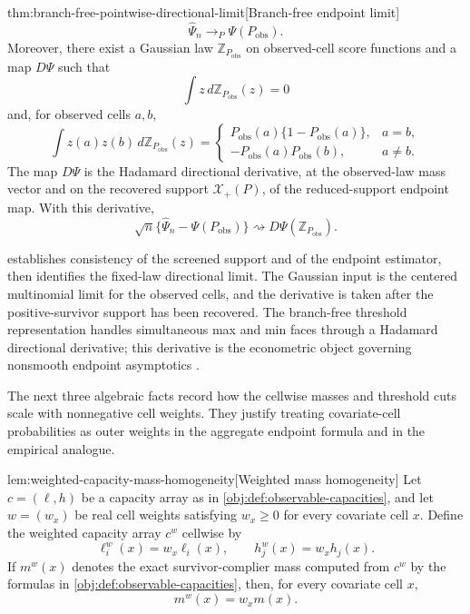 \begin{theoremv}{thm:branch-free-pointwise-directional-limit}[Branch-free endpoint limit]
\[
\widehat\Psi_n\to_P\Psi(P_{\mathrm{obs}}).
\]
Moreover, there exist a Gaussian law \(\mathbb Z_{P_{\mathrm{obs}}}\) on observed-cell score functions and a map \(D\Psi\) such that
\[
\int z\,d\mathbb Z_{P_{\mathrm{obs}}}(z)=0
\]
and, for observed cells \(a,b\),
\[
\int z(a)z(b)\,d\mathbb Z_{P_{\mathrm{obs}}}(z)
=
\begin{cases}
P_{\mathrm{obs}}(a)\{1-P_{\mathrm{obs}}(a)\}, & a=b,\\
-P_{\mathrm{obs}}(a)P_{\mathrm{obs}}(b), & a\ne b.
\end{cases}
\]
The map \(D\Psi\) is the Hadamard directional derivative, at the observed-law mass vector and on the recovered support \(\mathcal X_+(P)\), of the reduced-support endpoint map.  With this derivative,
\[
\sqrt n\{\widehat\Psi_n-\Psi(P_{\mathrm{obs}})\}
\rightsquigarrow
D\Psi(\mathbb Z_{P_{\mathrm{obs}}}).
\]
\end{theoremv}

 establishes consistency of the screened support and of the endpoint estimator, then identifies the fixed-law directional limit.  The Gaussian input  is the centered multinomial limit for the observed cells, and the derivative is taken after the positive-survivor support  has been recovered.  The branch-free threshold representation handles simultaneous max and min faces through a Hadamard directional derivative; this derivative is the econometric object governing nonsmooth endpoint asymptotics \citep{FangSantos2019,HongLi2018}.

The next three algebraic facts record how the cellwise masses and threshold cuts scale with nonnegative cell weights.  They justify treating covariate-cell probabilities as outer weights in the aggregate endpoint formula and in the empirical analogue.

\begin{lemmav}{lem:weighted-capacity-mass-homogeneity}[Weighted mass homogeneity]
Let \(c=(\ell,h)\) be a capacity array as in \cref{obj:def:observable-capacities}, and let \(w=(w_x)\) be real cell weights satisfying \(w_x\ge 0\) for every covariate cell \(x\).  Define the weighted capacity array \(c^w\) cellwise by
\[
\ell_i^w(x)=w_x\ell_i(x),
\qquad
h_j^w(x)=w_xh_j(x).
\]
If \(m^w(x)\) denotes the exact survivor-complier mass computed from \(c^w\) by the formulas in \cref{obj:def:observable-capacities}, then, for every covariate cell \(x\),
\[
m^w(x)=w_x m(x).
\]
\end{lemmav}

